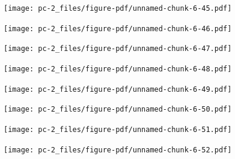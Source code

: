 \documentclass[
  letterpaper,
  DIV=11,
  numbers=noendperiod]{scrreprt}
\begin{document}
\begin{figure}[H]

{\centering \texttt{[image: pc-2\_files/figure-pdf/unnamed-chunk-6-45.pdf]}

}

\end{figure}

\begin{figure}[H]

{\centering \texttt{[image: pc-2\_files/figure-pdf/unnamed-chunk-6-46.pdf]}

}

\end{figure}

\begin{figure}[H]

{\centering \texttt{[image: pc-2\_files/figure-pdf/unnamed-chunk-6-47.pdf]}

}

\end{figure}

\begin{figure}[H]

{\centering \texttt{[image: pc-2\_files/figure-pdf/unnamed-chunk-6-48.pdf]}

}

\end{figure}

\begin{figure}[H]

{\centering \texttt{[image: pc-2\_files/figure-pdf/unnamed-chunk-6-49.pdf]}

}

\end{figure}

\begin{figure}[H]

{\centering \texttt{[image: pc-2\_files/figure-pdf/unnamed-chunk-6-50.pdf]}

}

\end{figure}

\begin{figure}[H]

{\centering \texttt{[image: pc-2\_files/figure-pdf/unnamed-chunk-6-51.pdf]}

}

\end{figure}

\begin{figure}[H]

{\centering \texttt{[image: pc-2\_files/figure-pdf/unnamed-chunk-6-52.pdf]}

}

\end{figure}
\end{document}
